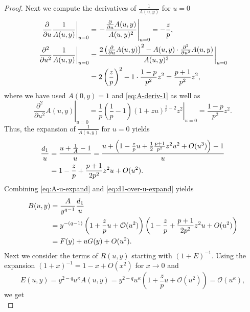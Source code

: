 \documentclass{article}
\begin{document}
\begin{proof}
    Next we compute the derivatives of $\frac{1}{A(u,y)}$ for $u=0$
    \begin{align}
        \left.\frac{\partial }{\partial u} \frac{1}{A(u,y)}\right|_{u=0}
        &= \left. -\frac{\frac{\partial }{\partial u} A(u,y)}{A(u,y)^2} \right|_{u=0}
        = -\frac{z}{p},
        \label{eq:invA-deriv-1}
        \\
        \left.\frac{\partial^2 }{\partial u^2} \frac{1}{A(u,y)}\right|_{u=0}
        &= \frac{2 \left(\frac{\partial }{\partial u} A(u,y) \right)^2 - A(u,y) \cdot \frac{\partial^2 }{\partial u^2} A(u,y)}{A(u,y)^3} \bigg|_{u=0} \notag \\
        &= 2 \left(\frac{z}{p}\right)^2 - 1 \cdot \frac{1-p}{p^2}z^2
        = \frac{p+1}{p^2}z^2,
        \label{eq:invA-deriv-2}
    \end{align}
    where we have used $A(0,y) = 1$ and \eqref{eq:A-deriv-1} as well as
    \begin{equation*}
        \left.\frac{\partial^2 }{\partial u^2} A(u,y)\right|_{u=0}
        = \left.\frac{1}{p}\left(\frac{1}{p}-1\right)(1+zu)^{\frac{1}{p}-2} z^2\right|_{u=0}
        = \frac{1-p}{p^2}z^2.
        \label{eq:A-deriv-2}
    \end{equation*}
    Thus, the expansion of $\frac{1}{A(u,y)}$ for $u=0$ yields
    \begin{align}
        \label{eq:d1-over-u-expand}
        \frac{d_1}{u}
        &= \frac{u + \frac{1}{A} - 1}{u}
        = \frac{u  + \left( 1 - \frac{z}{p} u + \frac12 \frac{p+1}{p^2}z^2 u^2 + O(u^3) \right) - 1}{u} \notag \\
        &= 1-\frac{z}{p} + \frac{p+1}{2p^2}z^2 u + O(u^2).
    \end{align}
    Combining \eqref{eq:A-u-expand} and \eqref{eq:d1-over-u-expand} yields
    \begin{align}
        B(u,y)
        &= \frac{A}{y^{q-1}}\frac{d_1}{u} \notag\\
        &= y^{-(q-1)} \left( 1 + \frac{z}{p} u + \mathcal{O}(u^2) \right) \left( 1 - \frac{z}{p} + \frac{p+1}{2p^2}z^2 u + O(u^2) \right) \notag\\
        &= F(y) + uG(y) + O(u^2). \label{eq:B-u-expand}
    \end{align}
    Next we consider the terms of $R(u,y)$ starting with $(1+E)^{-1}$.
    Using the expansion $(1+x)^{-1} = 1 - x + O(x^2)$ for $x \to 0$ and
    \[
        E(u,y) = y^{2-q}u^\kappa A(u,y) = y^{2-q}u^\kappa \left( 1 + \frac{z}{p} u + \mathcal{O}(u^2) \right) = \mathcal{O}(u^\kappa),
    \]
    we get
    \begin{equation}

\end{equation}
\end{proof}
\end{document}
